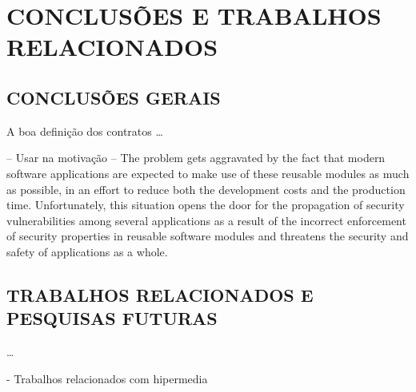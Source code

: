 
\chapter{CONCLUSÕES E TRABALHOS RELACIONADOS}
\vspace{-6mm}


\section{CONCLUSÕES GERAIS}
\vspace{-6mm}

A boa definição dos contratos \ldots 
\vspace{-6mm}


-- Usar na motivação --
The problem gets aggravated by
the fact that modern software applications are expected to
make use of these reusable modules as much as possible,
in an effort to reduce both the development costs and the
production time. Unfortunately, this situation opens the door
for the propagation of security vulnerabilities among several
applications as a result of the incorrect enforcement of security
properties in reusable software modules and threatens the
security and safety of applications as a whole.
\cite{rubio2013verifying}


\section{TRABALHOS RELACIONADOS E PESQUISAS FUTURAS }
\vspace{-6mm}

\ldots

- Trabalhos relacionados com hipermedia
